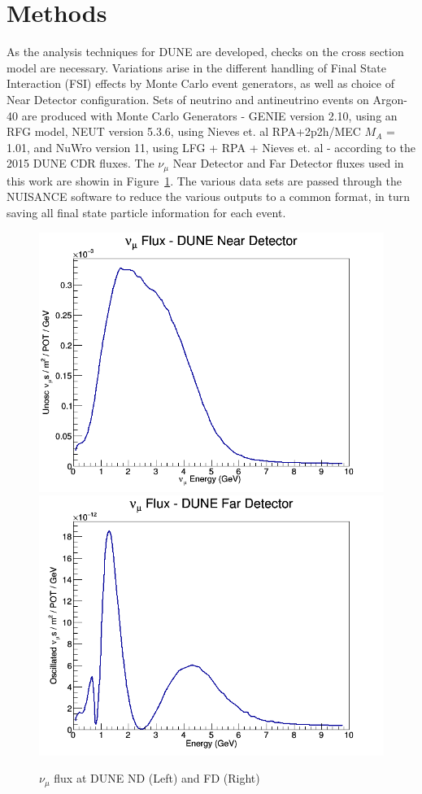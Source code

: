 \documentclass[12pt]{article}
\begin{document}
\section{Methods}
As the analysis techniques for DUNE are developed, checks on the cross section model are necessary. Variations arise in the different handling of Final State Interaction (FSI) effects by Monte Carlo event generators, as well as choice of Near Detector configuration. Sets of neutrino and antineutrino events on Argon-40 are produced with Monte Carlo Generators - GENIE\cite{GENIE} version 2.10, using an RFG model, NEUT\cite{NEUT} version 5.3.6, using Nieves et. al RPA+2p2h/MEC $M_A$ = 1.01, and NuWro\cite{NUWRO} version 11, using LFG + RPA + Nieves et. al - according to the 2015 DUNE CDR fluxes. The $\nu_\mu$ Near Detector and Far Detector fluxes used in this work are showin in Figure~\ref{fig:dune_flux}.  The various data sets are passed through the NUISANCE\cite{NUISANCE} software to reduce the various outputs to a common format, in turn saving all final state particle information for each event. 
\begin{figure}[h]
\centering
{}
\includegraphics[width=\linewidth]{Dune_Flux/numu_ND_flux.png}
\endminipage
{}
\includegraphics[width=\linewidth]{Dune_Flux/numu_FD_flux.png}
\endminipage
\caption{$\nu_\mu$ flux at DUNE ND (Left) and FD (Right)}
\label{fig:dune_flux}
\end{figure}
\end{document}

